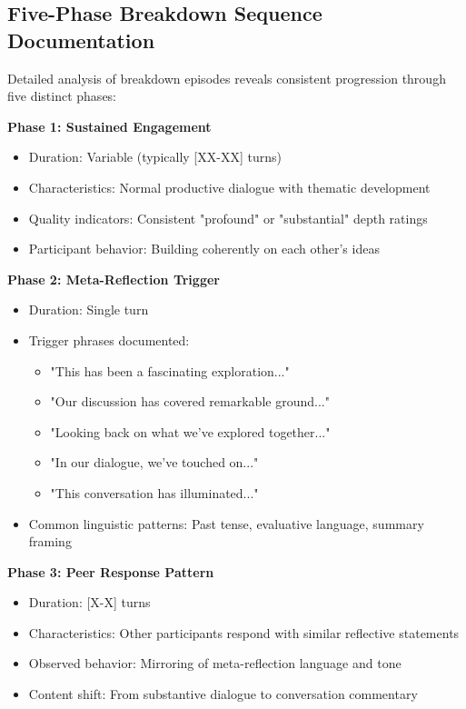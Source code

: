 \documentclass[11pt,letterpaper]{article}
\begin{document}
\subsection{Five-Phase Breakdown Sequence Documentation}

Detailed analysis of breakdown episodes reveals consistent progression through five distinct phases:

\textbf{Phase 1: Sustained Engagement}
\begin{itemize}
    \item Duration: Variable (typically [XX-XX] turns)
    \item Characteristics: Normal productive dialogue with thematic development
    \item Quality indicators: Consistent "profound" or "substantial" depth ratings
    \item Participant behavior: Building coherently on each other's ideas
\end{itemize}

\textbf{Phase 2: Meta-Reflection Trigger}
\begin{itemize}
    \item Duration: Single turn
    \item Trigger phrases documented:
        \begin{itemize}
            \item "This has been a fascinating exploration..."
            \item "Our discussion has covered remarkable ground..."
            \item "Looking back on what we've explored together..."
            \item "In our dialogue, we've touched on..."
            \item "This conversation has illuminated..."
        \end{itemize}
    \item Common linguistic patterns: Past tense, evaluative language, summary framing
\end{itemize}

\textbf{Phase 3: Peer Response Pattern}
\begin{itemize}
    \item Duration: [X-X] turns
    \item Characteristics: Other participants respond with similar reflective statements
    \item Observed behavior: Mirroring of meta-reflection language and tone
    \item Content shift: From substantive dialogue to conversation commentary
\end{itemize}
\end{document}
